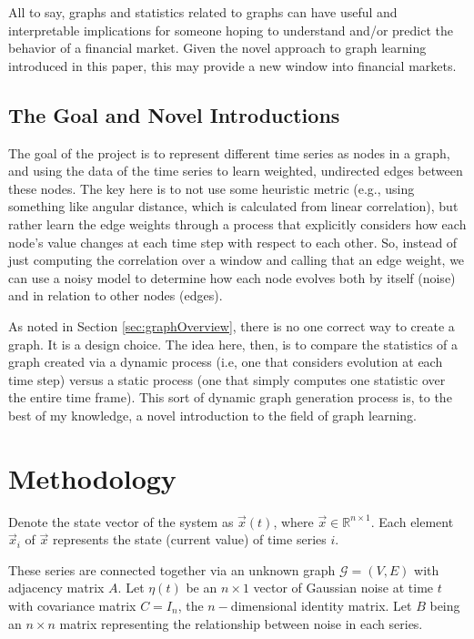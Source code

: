 \documentclass{article}
\theoremstyle{definition}
\begin{document}
All to say, graphs and statistics related to graphs can have useful and interpretable implications for someone hoping to understand and/or predict the behavior of a financial market. Given the novel approach to graph learning introduced in this paper, this may provide a new window into financial markets.

\subsection{The Goal and Novel Introductions}
\label{sec:projectGoal}

The goal of the project is to represent different time series as nodes in a graph, and using the data of the time series to learn weighted, undirected edges between these nodes. The key here is to not use some heuristic metric (e.g., using something like angular distance, which is calculated from linear correlation), but rather learn the edge weights through a process that explicitly considers how each node's value changes at each time step with respect to each other. So, instead of just computing the correlation over a window and calling that an edge weight, we can use a noisy model to determine how each node evolves both by itself (noise) and in relation to other nodes (edges).

As noted in Section \ref{sec:graphOverview}, there is no one correct way to create a graph. It is a design choice. The idea here, then, is to compare the statistics of a graph created via a dynamic process (i.e, one that considers evolution at each time step) versus a static process (one that simply computes one statistic over the entire time frame). This sort of dynamic graph generation process is, to the best of my knowledge, a novel introduction to the field of graph learning.

\section{Methodology}
\label{sec:methods}

Denote the state vector of the system as $\Vec{x}(t)$, where $\Vec{x} \in \mathbb{R}^{n \times 1}$. Each element $\Vec{x}_i$ of $\Vec{x}$ represents the state (current value) of time series $i$. 

These series are connected together via an unknown graph $\mathcal{G} = (V, E)$ with adjacency matrix $A$. Let $\eta(t)$ be an $n \times 1$ vector of Gaussian noise at time $t$ with covariance matrix $C = I_n$, the $n-$dimensional identity matrix. Let $B$ being an $n \times n$ matrix representing the relationship between noise in each series. 
\end{document}
